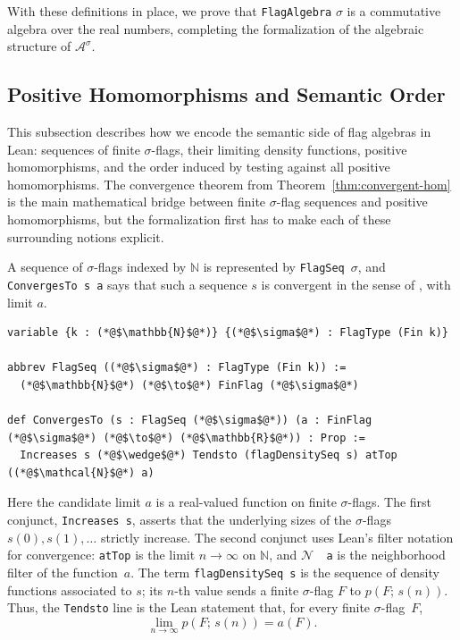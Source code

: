 \documentclass[acmsmall,screen=true,acmthm=false]{acmart}
\newcommand{\den}[2]{p(#1;\,#2)}
\DeclareRobustCommand{\lean}[1]{{\def\_{\textunderscore\allowbreak}\texttt{#1}}}
\begin{document}
With these definitions in place, we prove that \lean{FlagAlgebra} $\sigma$ is
a commutative algebra over the real numbers, completing the formalization of
the algebraic structure of $\mathcal{A}^\sigma$.

\subsection{Positive Homomorphisms and Semantic Order}

This subsection describes how we encode the semantic side of flag algebras in
Lean: sequences of finite $\sigma$-flags, their limiting density functions, positive
homomorphisms, and the order induced by testing against all positive
homomorphisms.  The convergence theorem from
Theorem~\ref{thm:convergent-hom} is the main mathematical bridge between finite
$\sigma$-flag sequences and positive homomorphisms, but the formalization first has to
make each of these surrounding notions explicit.

A sequence of $\sigma$-flags indexed by $\mathbb{N}$ is represented by
\lean{FlagSeq}~$\sigma$, and \lean{ConvergesTo s a} says that such a sequence
$s$ is convergent in the sense of , with
limit $a$.
\begin{lstlisting}
variable {k : (*@$\mathbb{N}$@*)} {(*@$\sigma$@*) : FlagType (Fin k)}

abbrev FlagSeq ((*@$\sigma$@*) : FlagType (Fin k)) :=
  (*@$\mathbb{N}$@*) (*@$\to$@*) FinFlag (*@$\sigma$@*)

def ConvergesTo (s : FlagSeq (*@$\sigma$@*)) (a : FinFlag (*@$\sigma$@*) (*@$\to$@*) (*@$\mathbb{R}$@*)) : Prop :=
  Increases s (*@$\wedge$@*) Tendsto (flagDensitySeq s) atTop ((*@$\mathcal{N}$@*) a)
\end{lstlisting}
Here the candidate limit \(a\) is a real-valued function on finite
\(\sigma\)-flags.  The first conjunct, \lean{Increases s}, asserts that the
underlying sizes of the \(\sigma\)-flags \(s(0),s(1),\ldots\) strictly increase.  The
second conjunct uses Lean's filter notation for convergence:
\lean{atTop} is the limit \(n\to\infty\) on \(\mathbb{N}\), and
\lean{$\mathcal{N}$\,\,a} is the neighborhood filter of the function~\(a\).  The term
\lean{flagDensitySeq s} is the sequence of density functions associated to
\(s\); its \(n\)-th value sends a finite \(\sigma\)-flag \(F\) to
\(\den{F}{s(n)}\).  Thus, the \lean{Tendsto} line is the Lean statement that,
for every finite \(\sigma\)-flag~\(F\),
\[
  \lim_{n\to\infty}\den{F}{s(n)}=a(F).
\]
\end{document}
